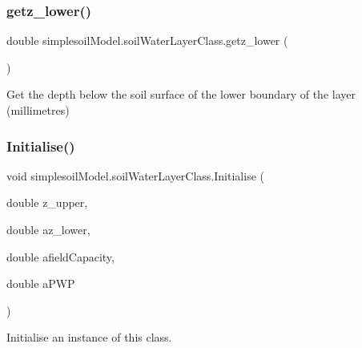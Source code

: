 \mbox{\label{classsimplesoil_model_1_1soil_water_layer_class_a19bf8dada96698408785d7107cd3e727}} 
\subsubsection{\texorpdfstring{getz\_lower()}{getz\_lower()}}
{\footnotesize\ttfamily double simplesoil\+Model.\+soil\+Water\+Layer\+Class.\+getz\+\_\+lower (\begin{DoxyParamCaption}{ }\end{DoxyParamCaption})\hspace{0.3cm}{\ttfamily [inline]}}



Get the depth below the soil surface of the lower boundary of the layer (millimetres) 

\mbox{\label{classsimplesoil_model_1_1soil_water_layer_class_aeb0889b8e65ad603be4d729c3eef94db}} 
\subsubsection{\texorpdfstring{Initialise()}{Initialise()}}
{\footnotesize\ttfamily void simplesoil\+Model.\+soil\+Water\+Layer\+Class.\+Initialise (\begin{DoxyParamCaption}\item[{double}]{z\+\_\+upper,  }\item[{double}]{az\+\_\+lower,  }\item[{double}]{afield\+Capacity,  }\item[{double}]{a\+P\+WP }\end{DoxyParamCaption})\hspace{0.3cm}{\ttfamily [inline]}}



Initialise an instance of this class. 


